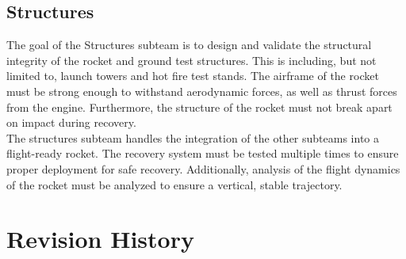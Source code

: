 \documentclass[12pt,article]{memoir}
\begin{document}
\section{Structures}

The goal of the Structures subteam is to design and validate the structural integrity of the rocket and ground test structures. This is including, but not limited to, launch towers and hot fire test stands. The airframe of the rocket must be strong enough to withstand aerodynamic forces, as well as thrust forces from the engine. Furthermore, the structure of the rocket must not break apart on impact during recovery. 
\\
The structures subteam handles the integration of the other subteams into a flight-ready rocket. The recovery system must be tested multiple times to ensure proper deployment for safe recovery. Additionally, analysis of the flight dynamics of the rocket must be analyzed to ensure a vertical, stable trajectory.


\clearpage
\chapter{Revision History}

\begin{table}[h]
\end{table}

\end{document}
